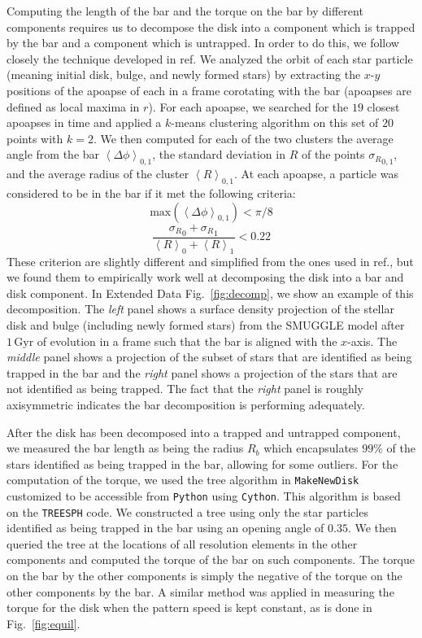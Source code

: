 \documentclass{natureprintstyle}
\begin{document}
Computing the length of the bar and the torque on the bar by different
components requires us to decompose the disk into a component which is trapped
by the bar and a component which is untrapped. In order to do this, we follow
closely the technique developed in ref.\cite{2016MNRAS.463.1952P} We analyzed
the orbit of each star particle (meaning initial disk, bulge, and newly formed
stars) by extracting the $x$-$y$ positions of the apoapse of each in a frame
corotating with the bar (apoapses are defined as local maxima in $r$). For
each apoapse, we searched for the $19$ closest apoapses in time and applied a
$k$-means clustering algorithm on this set of $20$ points with $k=2$. We then
computed for each of the two clusters the average angle from the bar
$\left<\Delta \phi\right>_{0,1}$, the standard deviation in $R$ of the points
${\sigma_R}_{0,1}$, and the average radius of the cluster
$\left<R\right>_{0,1}$. At each apoapse, a particle was considered to be in
the bar if it met the following criteria:
\begin{equation}
\textrm{max}\left(\left<\Delta \phi\right>_{0,1}\right) < \pi / 8
\end{equation}
\begin{equation}
\frac{{\sigma_R}_0 + {\sigma_R}_1}{\left<R\right>_0 + \left<R\right>_1} < 0.22
\end{equation}
These criterion are slightly different and simplified from the ones used in
ref.\cite{2016MNRAS.463.1952P}, but we found them to empirically work well at
decomposing the disk into a bar and disk component. In Extended Data
Fig.~\ref{fig:decomp}, we show an example of this decomposition. The
\textit{left} panel shows a surface density projection of the stellar disk and
bulge (including newly formed stars) from the SMUGGLE model after
$1\,\text{Gyr}$ of evolution in a frame such that the bar is aligned with the
$x$-axis. The \textit{middle} panel shows a projection of the subset of stars
that are identified as being trapped in the bar and the \textit{right} panel
shows a projection of the stars that are not identified as being trapped. The
fact that the \textit{right} panel is roughly axisymmetric indicates the bar
decomposition is performing adequately.

After the disk has been decomposed into a trapped and untrapped component, we
measured the bar length as being the radius $R_b$ which encapsulates $99\%$ of
the stars identified as being trapped in the bar, allowing for some outliers.
For the computation of the torque, we used the tree algorithm in
\texttt{MakeNewDisk}\cite{2005MNRAS.361..776S} customized to be accessible
from \texttt{Python} using \texttt{Cython}. This algorithm is based on the
\texttt{TREESPH} code.\cite{1989ApJS...70..419H} We constructed a tree using
only the star particles identified as being trapped in the bar using an
opening angle of $0.35$. We then queried the tree at the locations of all
resolution elements in the other components and computed the torque of the bar
on such components. The torque on the bar by the other components is simply
the negative of the torque on the other components by the bar. A similar
method was applied in measuring the torque for the disk when the pattern speed
is kept constant, as is done in Fig.~\ref{fig:equil}.
\end{document}
